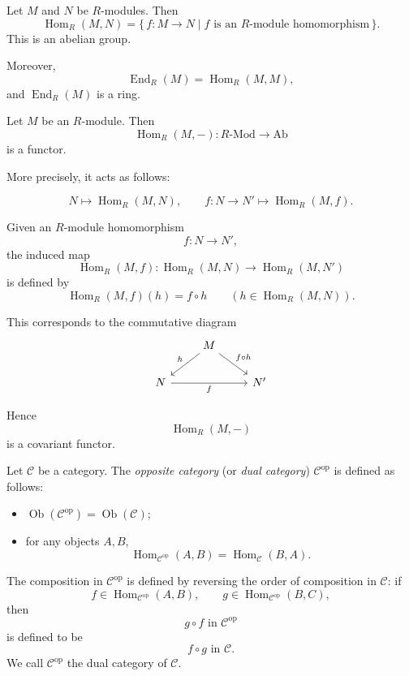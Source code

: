Let $M$ and $N$ be $R$-modules. Then
\[
    \operatorname{Hom}_R(M,N)
    =
    \{\, f:M\to N \mid f \text{ is an } R\text{-module homomorphism} \,\}.
\]
This is an abelian group.

Moreover,
\[
    \operatorname{End}_R(M)=\operatorname{Hom}_R(M,M),
\]
and $\operatorname{End}_R(M)$ is a ring.

\begin{example}
    Let $M$ be an $R$-module. Then
    \[
        \operatorname{Hom}_R(M,-): R\text{-}\mathrm{Mod} \to \mathrm{Ab}
    \]
    is a functor.

    More precisely, it acts as follows:

    \[
        N \longmapsto \operatorname{Hom}_R(M,N),
        \qquad
        f:N \to N' \longmapsto \operatorname{Hom}_R(M,f).
    \]

    Given an $R$-module homomorphism
    \[
        f:N \to N',
    \]
    the induced map
    \[
        \operatorname{Hom}_R(M,f): \operatorname{Hom}_R(M,N) \to \operatorname{Hom}_R(M,N')
    \]
    is defined by
    \[
        \operatorname{Hom}_R(M,f)(h)=f\circ h
        \qquad
        (h\in \operatorname{Hom}_R(M,N)).
    \]

    This corresponds to the commutative diagram
    \[
        \begin{tikzcd}
            & M \arrow[dl, "h"'] \arrow[dr, "f\circ h"] & \\
            N \arrow[rr, "f"'] & & N'
        \end{tikzcd}
    \]

    Hence
    \[
        \operatorname{Hom}_R(M,-)
    \]
    is a covariant functor.
\end{example}

\begin{definition}
    Let $\mathcal C$ be a category. The \emph{opposite category} (or \emph{dual category}) $\mathcal C^{\mathrm{op}}$ is defined as follows:
    \begin{itemize}
        \item $\operatorname{Ob}(\mathcal C^{\mathrm{op}})=\operatorname{Ob}(\mathcal C)$;
        \item for any objects $A,B$,
              \[
                  \operatorname{Hom}_{\mathcal C^{\mathrm{op}}}(A,B)
                  =
                  \operatorname{Hom}_{\mathcal C}(B,A).
              \]
    \end{itemize}
    The composition in $\mathcal C^{\mathrm{op}}$ is defined by reversing the order of composition in $\mathcal C$: if
    \[
        f \in \operatorname{Hom}_{\mathcal C^{\mathrm{op}}}(A,B),
        \qquad
        g \in \operatorname{Hom}_{\mathcal C^{\mathrm{op}}}(B,C),
    \]
    then
    \[
        g\circ f \text{ in } \mathcal C^{\mathrm{op}}
    \]
    is defined to be
    \[
        f\circ g \text{ in } \mathcal C.
    \]
    We call $\mathcal C^{\mathrm{op}}$ the dual category of $\mathcal C$.
\end{definition}

